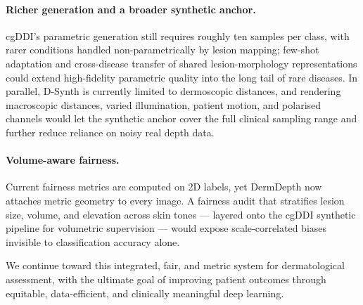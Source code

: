 \documentclass[11pt]{ucthesis}
\begin{document}
\paragraph{Richer generation and a broader synthetic anchor.}
cgDDI's parametric generation still requires roughly ten samples per class, with rarer conditions handled non-parametrically by lesion mapping; few-shot adaptation and cross-disease transfer of shared lesion-morphology representations could extend high-fidelity parametric quality into the long tail of rare diseases. In parallel, D-Synth is currently limited to dermoscopic distances, and rendering macroscopic distances, varied illumination, patient motion, and polarised channels would let the synthetic anchor cover the full clinical sampling range and further reduce reliance on noisy real depth data.

\paragraph{Volume-aware fairness.}
Current fairness metrics are computed on 2D labels, yet DermDepth now attaches metric geometry to every image. A fairness audit that stratifies lesion size, volume, and elevation across skin tones --- layered onto the cgDDI synthetic pipeline for volumetric supervision --- would expose scale-correlated biases invisible to classification accuracy alone.

We continue toward this integrated, fair, and metric system for dermatological assessment, with the ultimate goal of improving patient outcomes through equitable, data-efficient, and clinically meaningful deep learning.



\end{document}
